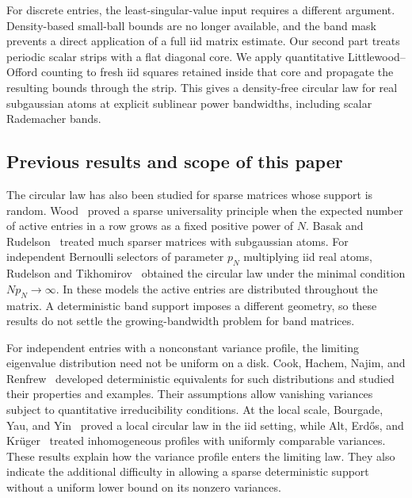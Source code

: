 \documentclass[11pt,reqno]{amsart}
\numberwithin{equation}{section}
\theoremstyle{plain}
\theoremstyle{definition}
\theoremstyle{remark}
\begin{document}
For discrete entries, the least-singular-value input requires a different
argument. Density-based small-ball bounds are no longer available, and
the band mask prevents a direct application of a full iid matrix
estimate. Our second part treats periodic scalar strips with a flat
diagonal core. We apply quantitative Littlewood--Offord counting to
fresh iid squares retained inside that core and propagate the resulting
bounds through the strip. This gives a density-free circular law for
real subgaussian atoms at explicit sublinear power bandwidths, including
scalar Rademacher bands.

\subsection{Previous results and scope of this paper}
The circular law has also been studied for sparse matrices whose
support is random. Wood~\cite{wood2012} proved a sparse universality
principle when the expected number of active entries in a row grows as
a fixed positive power of $N$. Basak and Rudelson~\cite{basak2019}
treated much sparser matrices with subgaussian atoms. For independent
Bernoulli selectors of parameter $p_N$ multiplying iid real atoms,
Rudelson and Tikhomirov~\cite{rudelson2019sparse} obtained the circular
law under the minimal condition $Np_N\to\infty$. In these models the
active entries are distributed throughout the matrix. A deterministic
band support imposes a different geometry, so these results do not
settle the growing-bandwidth problem for band matrices.

For independent entries with a nonconstant variance profile, the
limiting eigenvalue distribution need not be uniform on a disk.
Cook, Hachem, Najim, and Renfrew~\cite{cook2018profile,cook2022profile}
developed deterministic equivalents for such distributions and studied
their properties and examples. Their assumptions allow vanishing
variances subject to quantitative irreducibility conditions.
At the local scale, Bourgade, Yau, and Yin~\cite{MR3230002} proved a
local circular law in the iid setting, while Alt, Erd\H{o}s, and
Kr\"uger~\cite{alt2018} treated inhomogeneous profiles with uniformly
comparable variances. These results explain how the variance profile
enters the limiting law. They also indicate the additional difficulty
in allowing a sparse deterministic support without a uniform lower
bound on its nonzero variances.
\end{document}
